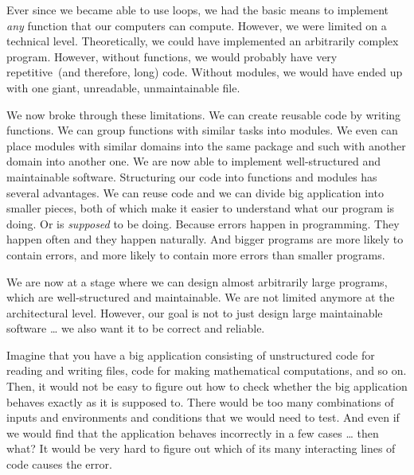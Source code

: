 Ever since we became able to use loops, we had the basic means to implement \emph{any} function that our computers can compute.
However, we were limited on a technical level.
Theoretically, we could have implemented an arbitrarily complex program.
However, without functions, we would probably have very repetitive~(and therefore, long) code.
Without modules, we would have ended up with one giant, unreadable, unmaintainable file.

We now broke through these limitations.
We can create reusable code by writing functions.
We can group functions with similar tasks into modules.
We even can place modules with similar domains into the same package and such with another domain into another one.
We are now able to implement well-structured and maintainable software.%
%
\FloatBarrier%
\endhsection%
%
%
\label{sec:unitTesting}%
%
%
%
Structuring our code into functions and modules has several advantages.
We can reuse code and we can divide big application into smaller pieces, both of which make it easier to understand what our program is doing.
Or is \emph{supposed} to be doing.
Because errors happen in programming.
They happen often and they happen naturally.
And bigger programs are more likely to contain errors, and more likely to contain more errors than smaller programs.

We are now at a stage where we can design almost arbitrarily large programs, which are well-structured and maintainable.
We are not limited anymore at the architectural level.
However, our goal is not to just design large maintainable software {\dots} we also want it to be correct and reliable.

Imagine that you have a big application consisting of unstructured code for reading and writing files, code for making mathematical computations, and so on.
Then, it would not be easy to figure out how to check whether the big application behaves exactly as it is supposed to.
There would be too many combinations of inputs and environments and conditions that we would need to test.
And even if we would find that the application behaves incorrectly in a few cases {\dots} then what?
It would be very hard to figure out which of its many interacting lines of code causes the error.


